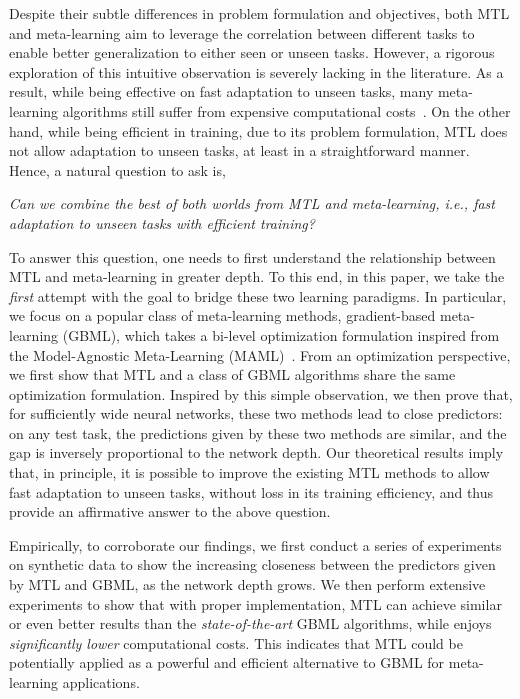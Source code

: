\documentclass{article}
\begin{document}
Despite their subtle differences in problem formulation and objectives, both MTL and meta-learning aim to leverage the correlation between different tasks to enable better generalization to either seen or unseen tasks. However, a rigorous exploration of this intuitive observation is severely lacking in the literature. As a result, while being effective on fast adaptation to unseen tasks, many meta-learning algorithms still suffer from expensive computational costs~\citep{nichol2018first,howtotrainmaml,hospedales2020metalearning}. On the other hand, while being efficient in training, due to its problem formulation, MTL does not allow adaptation to unseen tasks, at least in a straightforward manner. Hence, a natural question to ask is, 
\begin{quoting}
\itshape
\vspace*{-0.2em}
    Can we combine the best of both worlds from MTL and meta-learning, i.e., fast adaptation to unseen tasks with efficient training? 
\vspace*{-0.1em}
\end{quoting}
To answer this question, one needs to first understand the relationship between MTL and meta-learning in greater depth. To this end, in this paper, we take the \emph{first} attempt with the goal to bridge these two learning paradigms. In particular, we focus on a popular class of meta-learning methods, gradient-based meta-learning (GBML), which takes a bi-level optimization formulation inspired from the Model-Agnostic Meta-Learning (MAML)~\cite{maml}. From an optimization perspective, we first show that MTL and a class of GBML algorithms share the same optimization formulation. Inspired by this simple observation, we then prove that, for sufficiently wide neural networks, these two methods lead to close predictors: on any test task, the predictions given by these two methods are similar, and the gap is inversely proportional to the network depth. Our theoretical results imply that, in principle, it is possible to improve the existing MTL methods to allow fast adaptation to unseen tasks, without loss in its training efficiency, and thus provide an affirmative answer to the above question.

Empirically, to corroborate our findings, we first conduct a series of experiments on synthetic data to show the increasing closeness between the predictors given by MTL and GBML, as the network depth grows. We then perform extensive experiments to show that with proper implementation, MTL can achieve similar or even better results than the \emph{state-of-the-art} GBML algorithms, while enjoys \emph{significantly lower} computational costs. This indicates that MTL could be potentially applied as a powerful and efficient alternative to GBML for meta-learning applications. 
\end{document}
